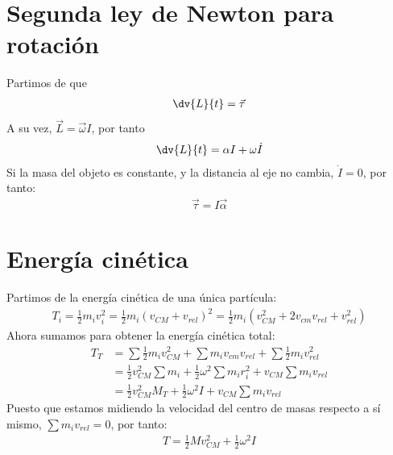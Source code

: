 \documentclass{article}
\begin{document}
\section{Segunda ley de Newton para rotación}
Partimos de que
\begin{equation}
    \begin{split}
        \dv{L}{t} = \vec{\tau }
    \end{split}
\end{equation}
A su vez, $\vec{L} = \vec{\omega }I$, por tanto
\begin{equation}
    \begin{split}
        \dv{L}{t} = \alpha I + \omega \dot{I}
    \end{split}
\end{equation}
Si la masa del objeto es constante, y la distancia al eje no cambia, $\dot{I} = 0$, por tanto:
\begin{equation}
    \begin{split}
        \boxed{\vec{\tau } = I \vec{\alpha }}
    \end{split}
\end{equation}
\section{Energía cinética}
Partimos de la energía cinética de una única partícula:
\begin{equation}
    \begin{split}
        T_{i} = \frac{1}{2} m_{i}v_{i}^{2} = \frac{1}{2} m_{i}(v_{CM}+v_{rel})^{2} = \frac{1}{2}m_{i}(v_{CM}^{2}+2v_{cm}v_{rel}+v_{rel}^{2})
    \end{split}
\end{equation}
Ahora sumamos para obtener la energía cinética total:
\begin{equation}
    \begin{split}
        T_{T} &= \sum \frac{1}{2} m_{i} v_{CM}^{2} + \sum m_{i}v_{cm}v_{rel} + \sum \frac{1}{2}m_{i}v_{rel}^{2}\\
        &=\frac{1}{2} v_{CM}^{2} \sum m_{i} + \frac{1}{2} \omega^{2} \sum m_{i} r_{i}^{2} + v_{CM} \sum m_{i} v_{rel}\\
        &=\frac{1}{2} v_{CM}^{2} M_{T} + \frac{1}{2} \omega^{2} I + v_{CM} \sum m_{i} v_{rel}
    \end{split}
\end{equation}
Puesto que estamos midiendo la velocidad del centro de masas respecto a sí mismo, $\sum m_{i} v_{rel} = 0$, por tanto:
\begin{equation}
    \begin{split}
        \boxed{T = \frac{1}{2}M v_{CM}^{2} + \frac{1}{2} \omega^{2} I}
    \end{split}
\end{equation}
\end{document}
